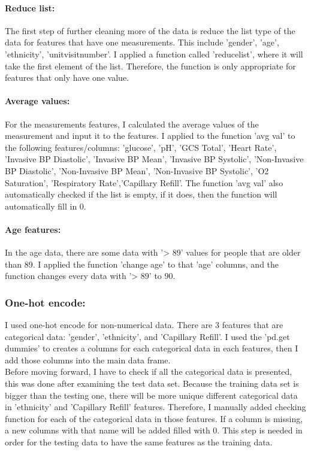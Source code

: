 \documentclass{article}
\begin{document}
\paragraph{Reduce list:}
The first step of further cleaning more of the data is reduce the list type of the data for features that have one measurements. This include 'gender', 'age', 'ethnicity',
'unitvisitnumber'. I applied a function called 'reduce\textunderscore list', where it will take the first element of the list. Therefore, the function is only appropriate for features that only have one value. 
\paragraph{Average values:}
For the measurements features, I calculated the average values of the measurement and input it to the features. I applied to the function 'avg \textunderscore val' to the following features/columns: {’glucose’, ’pH’, ’GCS Total’, ’Heart Rate’, ’Invasive BP Diastolic’, ’Invasive BP Mean’, ’Invasive BP Systolic’, ’Non-Invasive BP Diastolic’,
’Non-Invasive BP Mean’, ’Non-Invasive BP Systolic’, ’O2 Saturation’, ’Respiratory Rate’,’Capillary Refill’}. The function 'avg \textunderscore val' also automatically checked if the list is empty, if it does, then the function will automatically fill in 0. 
\paragraph{Age features:}
In the age data, there are some data with '> 89' values for people that are older than 89. I applied the function 'change \textunderscore age' to that 'age' columns, and the function changes every data with '> 89' to 90.
\subsubsection{One-hot encode:}
I used one-hot encode for non-numerical data. There are 3 features that are categorical data: 'gender', 'ethnicity', and 'Capillary Refill'. I used the 'pd.get \textunderscore dummies' to creates a columns for each categorical data in each features, then I add those columns into the main data frame. \\
Before moving forward, I have to check if all the categorical data is presented, this was done after examining the test data set. Because the training data set is bigger than the testing one, there will be more unique different categorical data in 'ethnicity' and 'Capillary Refill' features. Therefore, I manually added checking function for each of the categorical data in those features. If a column is missing, a new columns with that name will be added filled with 0. This step is needed in order for the testing data to have the same features as the training data. 
\end{document}

